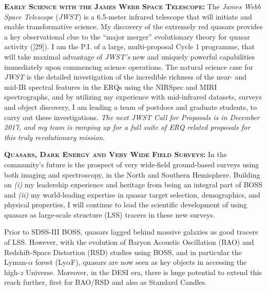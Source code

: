\documentclass[oneside, a4paper, onecolumn, 11pt]{article}
\begin{document}
\smallskip \smallskip
\smallskip \smallskip
\noindent
\textbf{\textsc{Early Science with the James Webb Space Telescope: }}
The {\it James Webb Space Telescope} ({\it JWST}) is a 6.5-meter
infrared telescope that will initiate and enable transformative
science. My discovery of the extremely red quasars provides a key
observational clue to the ``major merger'' evolutionary theory for
quasar activity ([29]). I am the P.I. of a large, multi-proposal Cycle 1
programme, that will take maximal advantage of {\it JWST's} new and
uniquely powerful capabilities immediately upon commencing science
operations. The natural science case for {\it JWST} is the detailed
investigation of the incredible richness of the near- and mid-IR spectral
features in the ERQs using the NIRSpec and MIRI spectrographs, and by
utilizing my experience with mid-infrared datasets, surveys and object
discovery, I am leading a team of postdocs and graduate students, to
carry out these investigations. {\it The next JWST Call for Proposals
is in December 2017, and my team is ramping up for a full suite of ERQ
related proposals for this truly revolutionary mission}.


\smallskip \smallskip
\smallskip
\smallskip
\noindent
\textbf{\textsc{Quasars, Dark Energy and Very Wide Field Surveys: }}
In the community's future is the prospect of very wide-field
ground-based surveys using both imaging and spectroscopy, in the North
and Southern Hemisphere. Building on {\it (i)} my leadership
experience and heritage from being an integral part of BOSS and {\it
(ii)} my world-leading expertise in quasar target selection,
demographics, and physical properties, I will continue to lead the
scientific development of using quasars as large-scale structure (LSS)
tracers in these new surveys.

\smallskip \smallskip
\noindent 
Prior to SDSS-III BOSS, quasars lagged behind massive galaxies as good
tracers of LSS. However, with the evolution of Baryon Acoustic
Oscillation (BAO) and Redshift-Space Distortion (RSD) studies using
BOSS, and in particular the Lyman-$\alpha$ forest (Ly$\alpha$F),
quasars are now seen as key objects in accessing the high-$z$
Universe. Moreover, in the DESI era, there is huge potential to extend
this reach further, first for BAO/RSD and also as Standard Candles. 
\end{document}
